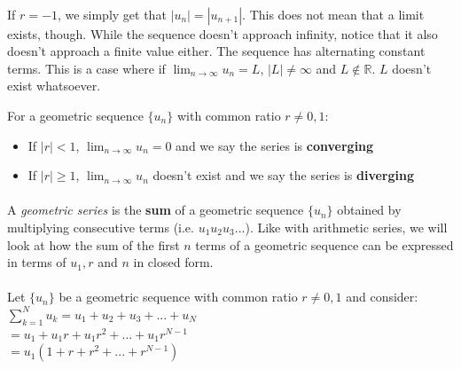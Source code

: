 \documentclass[12pt, a4paper, titlepage, twoside]{article}
\newcommand*{\R}{\mathbb{R}}
\begin{document}
	\paragraph{}
	If $r = -1$, we simply get that $|u_n| = |u_{n+1}|$. This does not mean that a limit exists, though. While the sequence doesn't
	approach infinity, notice that it also doesn't approach a finite value either. The sequence has alternating constant terms.
	This is a case where if $\displaystyle \lim_{n \to \infty} u_n = L$, $|L| \neq \infty$ and $L \not\in \R$. $L$ doesn't exist whatsoever.\\
	
	\begin{kp}
		For a geometric sequence $\{u_n\}$ with common ratio $r \neq 0,1$:
		\begin{itemize}
			\item If $|r| < 1$, $\displaystyle \lim_{n \to \infty} u_n = 0$ and we say the series is \textbf{converging}
			\item If $|r| \geqslant 1$, $\displaystyle \lim_{n \to \infty} u_n$ doesn't exist and we say the series is \textbf{diverging}
		\end{itemize}
	\end{kp}
	
	\paragraph{}
	A \textit{geometric series} is the \textbf{sum} of a geometric sequence $\{u_n\}$ obtained by multiplying consecutive
	terms (i.e. $u_1 u_2 u_3 ...$). Like with arithmetic series, we will look at how the sum of the first $n$ terms of a geometric 
	sequence can be expressed in terms of $u_1, r$ and  $n$ in closed form.
	
	\paragraph{}
	Let $\{u_n\}$ be a geometric sequence with common ratio $r \neq 0,1$ and consider: \\
	
	$\displaystyle \sum_{k=1}^N u_k = u_1 + u_2 + u_3 + ... + u_N$\\
	
	$= u_1 + u_1 r + u_1 r^2 + ... + u_1 r^{N-1}$\\
	
	$= u_1 (1 + r + r^2 + ... + r^{N-1})$\\
	
\end{document}
